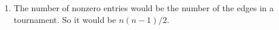 \begin{enumerate}
\begin{center}
\end{center}
\item The number of nonzero entries would be the number of the edges in a tournament. So it would be $n(n-1)/2$.
\end{enumerate}